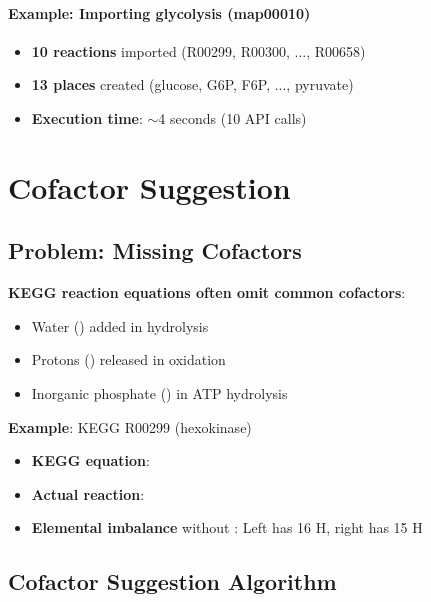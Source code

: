 \paragraph{Example: Importing glycolysis (map00010)}

\begin{itemize}
    \item \textbf{10 reactions} imported (R00299, R00300, ..., R00658)
    \item \textbf{13 places} created (glucose, G6P, F6P, ..., pyruvate)
    \item \textbf{Execution time}: $\sim$4 seconds (10 API calls)
\end{itemize}

\section{Cofactor Suggestion}
\label{sec:cofactor-suggestion}

\subsection{Problem: Missing Cofactors}
\label{subsec:missing-cofactors-problem}

\textbf{KEGG reaction equations often omit common cofactors}:

\begin{itemize}
    \item Water () added in hydrolysis
    \item Protons () released in oxidation
    \item Inorganic phosphate () in ATP hydrolysis
\end{itemize}

\textbf{Example}: KEGG R00299 (hexokinase)

\begin{itemize}
    \item \textbf{KEGG equation}: 
    \item \textbf{Actual reaction}: 
    \item \textbf{Elemental imbalance} without : Left has 16 H, right has 15 H
\end{itemize}

\subsection{Cofactor Suggestion Algorithm}
\label{subsec:cofactor-algorithm}

